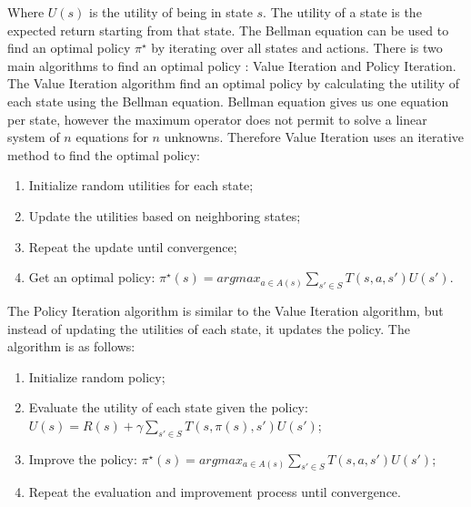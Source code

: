 \documentclass[10pt, twocolumn]{article}
\begin{document}
		Where $U(s)$ is the utility of being in state $s$. The utility of a state is the expected return starting from that state. The Bellman equation can be used to find an optimal policy $\pi^{\star}$ by iterating over all states and actions. There is two main algorithms to find an optimal policy : Value Iteration and Policy Iteration. The Value Iteration algorithm find an optimal policy by calculating the utility of each state using the Bellman equation. Bellman equation gives us one equation per state, however the maximum operator does not permit to solve a linear system of $n$ equations for $n$ unknowns. Therefore Value Iteration uses an iterative method to find the optimal policy:
		\begin{enumerate}
			\item Initialize random utilities for each state;
			\item Update the utilities based on neighboring states;
			\item Repeat the update until convergence;
			\item Get an optimal policy: $\pi^{\star}(s) = argmax_{a \in A(s)} \sum_{s' \in S} T(s, a, s') U(s')$.
		\end{enumerate}
		The Policy Iteration algorithm is similar to the Value Iteration algorithm, but instead of updating the utilities of each state, it updates the policy. The algorithm is as follows:
		\begin{enumerate}
			\item Initialize random policy;
			\item Evaluate the utility of each state given the policy: $U(s) = R(s) + \gamma \sum_{s' \in S} T(s, \pi(s), s') U(s')$;
			\item Improve the policy: $\pi^{\star}(s) = argmax_{a \in A(s)} \sum_{s' \in S} T(s, a, s') U(s')$;
			\item Repeat the evaluation and improvement process until convergence.
		\end{enumerate}
\end{document}
